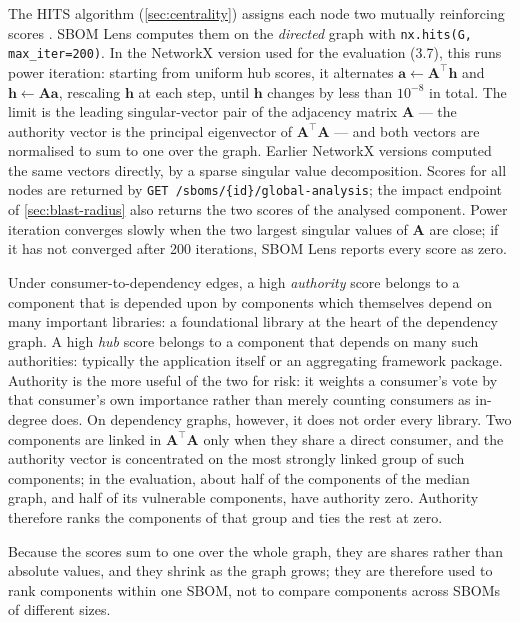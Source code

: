 The HITS algorithm (\autoref{sec:centrality}) assigns each node two mutually reinforcing scores \citep{Kleinberg1999}. SBOM Lens computes them on the \emph{directed} graph with \texttt{nx.hits(G, max\_iter=200)}. In the NetworkX version used for the evaluation (3.7), this runs power iteration: starting from uniform hub scores, it alternates \(\mathbf{a} \leftarrow \mathbf{A}^{\top}\mathbf{h}\) and \(\mathbf{h} \leftarrow \mathbf{A}\mathbf{a}\), rescaling \(\mathbf{h}\) at each step, until \(\mathbf{h}\) changes by less than \(10^{-8}\) in total. The limit is the leading singular-vector pair of the adjacency matrix \(\mathbf{A}\) --- the authority vector is the principal eigenvector of \(\mathbf{A}^{\top}\mathbf{A}\) --- and both vectors are normalised to sum to one over the graph. Earlier NetworkX versions computed the same vectors directly, by a sparse singular value decomposition. Scores for all nodes are returned by \texttt{GET /sboms/\{id\}/\allowbreak global-analysis}; the impact endpoint of \autoref{sec:blast-radius} also returns the two scores of the analysed component. Power iteration converges slowly when the two largest singular values of \(\mathbf{A}\) are close; if it has not converged after 200 iterations, SBOM Lens reports every score as zero.

Under consumer-to-dependency edges, a high \textit{authority} score belongs to a component that is depended upon by components which themselves depend on many important libraries: a foundational library at the heart of the dependency graph. A high \textit{hub} score belongs to a component that depends on many such authorities: typically the application itself or an aggregating framework package. Authority is the more useful of the two for risk: it weights a consumer's vote by that consumer's own importance rather than merely counting consumers as in-degree does. On dependency graphs, however, it does not order every library. Two components are linked in \(\mathbf{A}^{\top}\mathbf{A}\) only when they share a direct consumer, and the authority vector is concentrated on the most strongly linked group of such components; in the evaluation, about half of the components of the median graph, and half of its vulnerable components, have authority zero. Authority therefore ranks the components of that group and ties the rest at zero.

Because the scores sum to one over the whole graph, they are shares rather than absolute values, and they shrink as the graph grows; they are therefore used to rank components within one SBOM, not to compare components across SBOMs of different sizes.


